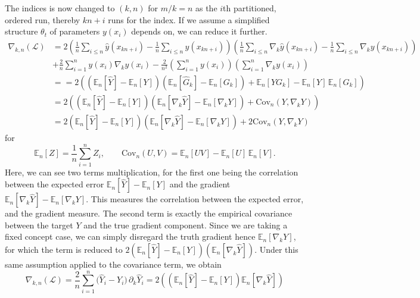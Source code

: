 The indices is now changed to $(k,n)$ for $m/k=n$ as the $i$th partitioned, ordered run, thereby $kn+i$ runs for the index. If we assume a simplified structure $\theta_{t}$ of parameters $y(x_{i})$ depends on, we can reduce it further.  
\begin{align}
\nabla_{k,n}(\mathcal{L})
&= 2\left(\frac{1}{n}\sum_{i\le n}\hat{y}(x_{kn+i}) - \frac{1}{n}\sum_{i\le n}y(x_{kn+i})\right)
   \left(\frac{1}{n}\sum_{i\le n}\nabla_k\hat{y}(x_{kn+i}) - \frac{1}{n}\sum_{i\le n}\nabla_k y(x_{kn+i})\right) \\
&+ \frac{2}{n}\sum_{i=1}^n y(x_i)\nabla_k y(x_i)
   - \frac{2}{n^2}\left(\sum_{i=1}^n y(x_i)\right)\left(\sum_{i=1}^n \nabla_k y(x_i)\right)\\
   & = = 2 \left(
   \left( \mathbb{E}_n[\hat{Y}] - \mathbb{E}_n[Y] \right)
   \left( \mathbb{E}_n[\hat{G}_k] - \mathbb{E}_n[G_k] \right)
   + \mathbb{E}_n[Y G_k] - \mathbb{E}_n[Y] \,\mathbb{E}_n[G_k]
\right)\\
&= 2 \left( 
   \left( \mathbb{E}_n[\hat{Y}] - \mathbb{E}_n[Y] \right)
   \left( \mathbb{E}_n[\nabla_k \hat{Y}] - \mathbb{E}_n[\nabla_k Y] \right)
   + \mathrm{Cov}_n\!\left(Y, \nabla_k Y\right)
\right) \\
& = 2 
   \left( \mathbb{E}_n[\hat{Y}] - \mathbb{E}_n[Y] \right)
   \left( \mathbb{E}_n[\nabla_k \hat{Y}] - \mathbb{E}_n[\nabla_k Y] \right) + 2\mathrm{Cov}_n\!\left(Y, \nabla_k Y\right)
\end{align}
for 
\begin{equation}
    \mathbb{E}_n[Z] = \frac{1}{n} \sum_{i=1}^n Z_i,
\qquad
\mathrm{Cov}_n(U,V) = \mathbb{E}_n[UV] - \mathbb{E}_n[U] \,\mathbb{E}_n[V].
\end{equation}
Here, we can see two terms multiplication, for the first one being the correlation between the expected error $\mathbb{E}_n[\hat{Y}] - \mathbb{E}_n[Y]$ and the gradient $\mathbb{E}_n[\nabla_k \hat{Y}] - \mathbb{E}_n[\nabla_k Y]$. This measures the correlation between the expected error, and the gradient measure. The second term is exactly the empirical covariance between the target $Y$ and the true gradient component. Since we are taking a fixed concept case, we can simply disregard the truth gradient hence $\mathbb{E}_n[\nabla_k Y]$, for which the term is reduced to $2\left( \mathbb{E}_n[\hat{Y}] - \mathbb{E}_n[Y] \right) \left( \mathbb{E}_n[\nabla_k \hat{Y}] \right)$. Under this same assumption applied to the covariance term, we obtain
\begin{equation}
    \nabla_{k,n}(\mathcal{L})
= \frac{2}{n}\sum_{i=1}^n \big(\hat Y_i - Y_i\big)\,\partial_k \hat Y_i = 2\left(
   \left( \mathbb{E}_n[\hat{Y}] - \mathbb{E}_n[Y] \right)
   \mathbb{E}_n[\nabla_k \hat{Y}]
\right)
\end{equation}
